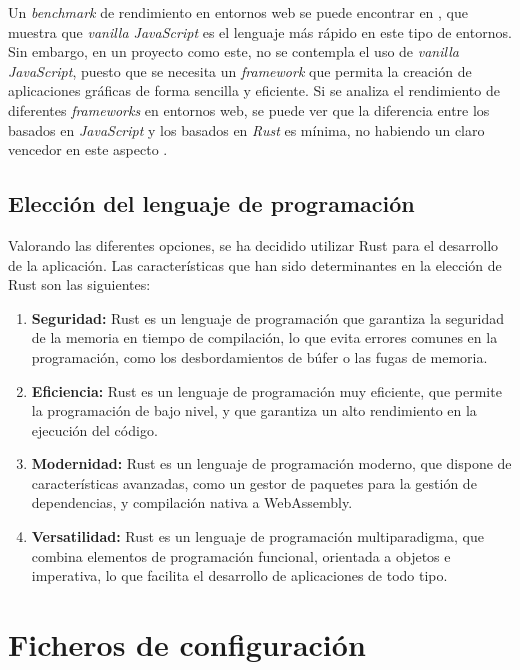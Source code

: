 Un \textit{benchmark} de rendimiento en entornos web se puede encontrar en \autocite{InteractiveResults}, que muestra que \textit{vanilla JavaScript} es el lenguaje más rápido en este tipo de entornos. Sin embargo, en un proyecto como este, no se contempla el uso de \textit{vanilla JavaScript}, puesto que se necesita un \textit{framework} que permita la creación de aplicaciones gráficas de forma sencilla y eficiente. Si se analiza el rendimiento de diferentes \textit{frameworks} en entornos web, se puede ver que la diferencia entre los basados en \textit{JavaScript} y los basados en \textit{Rust} es mínima, no habiendo un claro vencedor en este aspecto \autocite{InteractiveResults}.

\subsection{Elección del lenguaje de programación}

Valorando las diferentes opciones, se ha decidido utilizar Rust para el desarrollo de la aplicación. Las características que han sido determinantes en la elección de Rust son las siguientes:

\begin{enumerate}
    \item \textbf{Seguridad:} Rust es un lenguaje de programación que garantiza la seguridad de la memoria en tiempo de compilación, lo que evita errores comunes en la programación, como los desbordamientos de búfer o las fugas de memoria.
    \item \textbf{Eficiencia:} Rust es un lenguaje de programación muy eficiente, que permite la programación de bajo nivel, y que garantiza un alto rendimiento en la ejecución del código.
    \item \textbf{Modernidad:} Rust es un lenguaje de programación moderno, que dispone de características avanzadas, como un gestor de paquetes para la gestión de dependencias, y compilación nativa a WebAssembly.
    \item \textbf{Versatilidad:} Rust es un lenguaje de programación multiparadigma, que combina elementos de programación funcional, orientada a objetos e imperativa, lo que facilita el desarrollo de aplicaciones de todo tipo.
\end{enumerate}

\section{Ficheros de configuración} \label{sec:ficheros-configuracion}

